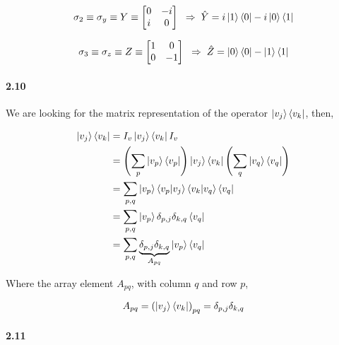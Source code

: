\begin{align}
  \label{eq:2.9.6}
  \sigma_2 \equiv \sigma_y \equiv Y \equiv
  \begin{bmatrix}
    0 & -i \\
    i & 0
  \end{bmatrix}
  \; \; \Rightarrow \; \hat{Y}=i\ket{1}\bra{0}-i\ket{0}\bra{1}
\end{align}

\begin{align}
  \label{eq:2.9.7}
  \sigma_3 \equiv \sigma_z \equiv Z \equiv
  \begin{bmatrix}
    1 & 0 \\
    0 & -1
  \end{bmatrix}
  \; \; \Rightarrow \; \hat{Z}=\ket{0}\bra{0}-\ket{1}\bra{1}
\end{align}



\paragraph{2.10} %

We are looking for the matrix representation of the operator $\ket{v_j}\bra{v_k}$, then,

\begin{align}
  \label{eq:2.10.1}
  \ket{v_j}\bra{v_k}&=I_v\ket{v_j}\bra{v_k}I_v \\
  &=\left(\sum_p\ket{v_p}\bra{v_p}\right)\ket{v_j}\bra{v_k}\left(\sum_q\ket{v_q}\bra{v_q}\right)\\
  &=\sum_{p,q}\ket{v_p}\braket{v_p|v_j}\braket{v_k|v_q}\bra{v_q}\\
  &=\sum_{p,q}\ket{v_p}\delta_{p,j}\delta_{k,q}\bra{v_q}\\
  &=\sum_{p,q}\underbrace{\delta_{p,j}\delta_{k,q}}_{A_{pq}}\ket{v_p}\bra{v_q}\\
\end{align}

Where the array element $A_{pq}$, with column $q$ and row $p$,

\begin{align}
  \label{eq:2.10.2}
  A_{pq} = \left(\ket{v_j}\bra{v_k}\right)_{pq}=\delta_{p,j}\delta_{k,q}
\end{align}


\paragraph{2.11} %

